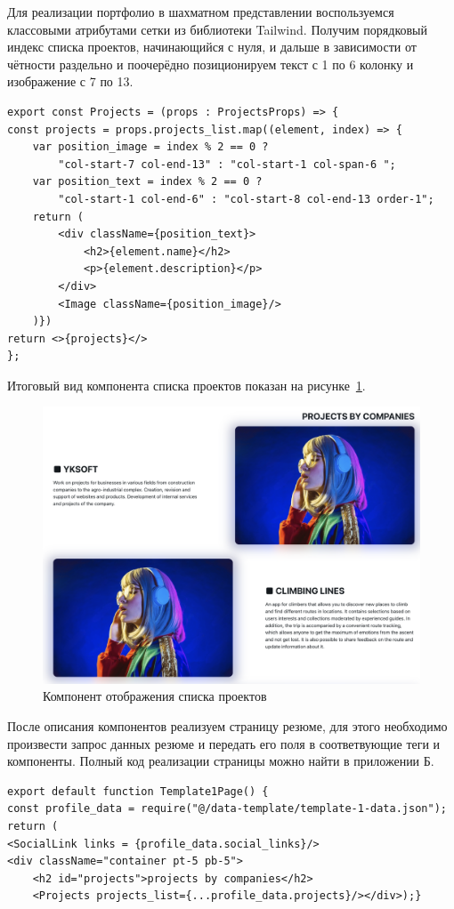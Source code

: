 \documentclass[master, och, pract]{SCWorks}
\begin{document}
Для реализации портфолио в шахматном представлении воспользуемся классовыми атрибутами сетки из библиотеки Tailwind. Получим порядковый индекс списка проектов, начинающийся с нуля, и дальше в зависимости от чётности раздельно и поочерёдно позиционируем текст с 1 по 6 колонку и изображение с 7 по 13.
\begin{verbatim}
export const Projects = (props : ProjectsProps) => {
const projects = props.projects_list.map((element, index) => {
    var position_image = index % 2 == 0 ? 
        "col-start-7 col-end-13" : "col-start-1 col-span-6 ";
    var position_text = index % 2 == 0 ? 
        "col-start-1 col-end-6" : "col-start-8 col-end-13 order-1";
    return (
        <div className={position_text}>
            <h2>{element.name}</h2>
            <p>{element.description}</p>
        </div>
        <Image className={position_image}/>
    )})
return <>{projects}</>
};
\end{verbatim}

Итоговый вид компонента списка проектов показан на рисунке~\ref{fig:4}. 
\begin{figure}[!ht]
    \centering
    \includegraphics[width=12cm]{images/image-resume-3.png}
    \caption{\label{fig:4}%
        Компонент отображения списка проектов}
\end{figure}

После описания компонентов реализуем страницу резюме, для этого необходимо произвести запрос данных резюме и передать его поля в соответвующие теги и компоненты. Полный код реализации страницы можно найти в приложении Б.  
\begin{verbatim}
export default function Template1Page() {
const profile_data = require("@/data-template/template-1-data.json");
return (
<SocialLink links = {profile_data.social_links}/>
<div className="container pt-5 pb-5">
    <h2 id="projects">projects by companies</h2>
    <Projects projects_list={...profile_data.projects}/></div>);}    
\end{verbatim}
\end{document}
